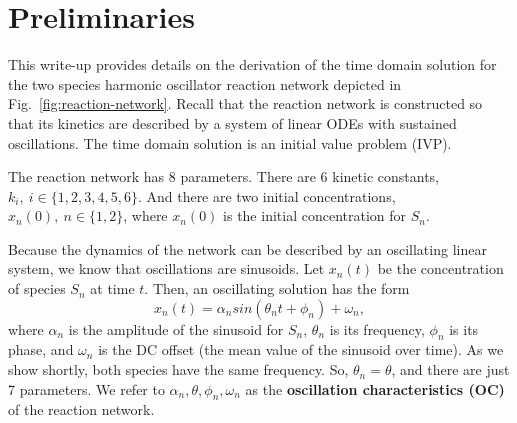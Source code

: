 \documentclass{bmcart}
\begin{document}



\setlength{\parindent}{15pt}

\section{Preliminaries}

This write-up provides details on the derivation of the
time domain solution for the two species harmonic oscillator
reaction network depicted in Fig.~\ref{fig:reaction-network}.
Recall that the reaction network is constructed so that its kinetics are described by a system of linear ODEs with sustained oscillations.
The time domain solution is an initial value problem (IVP).

\par
The reaction network has 8 parameters. There are 6 kinetic constants,
$k_i,~ i\in \{1, 2, 3, 4, 5, 6\}$. And there are two initial
concentrations, $x_n (0),~ n \in \{1, 2 \}$, where $x_n(0)$ is the
initial concentration for $S_n$.

Because the dynamics of the network can be described by an oscillating linear system, we
know that oscillations are sinusoids.
Let $x_n (t)$ be the concentration
of species $S_n$ at time $t$. Then, an oscillating solution has the
form \begin{equation*}
x_n(t) = \alpha_n sin(\theta_n t + \phi_n) + \omega_n,
\end{equation*} where $\alpha_n$ is the amplitude of the sinusoid for
$S_n$, $\theta_n$ is its frequency, $\phi_n$ is its phase, and
$\omega_n$ is the DC offset (the mean value of the sinusoid over
time).
As we show shortly, both species have the same frequency.
So, $\theta_n = \theta$, and there are just 7 parameters.
We refer to $\alpha_n, \theta, \phi_n, \omega_n$ as the
\textbf{oscillation characteristics (OC)} of the reaction network.
\end{document}
